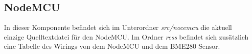 \subsection{NodeMCU}
In dieser Komponente befindet sich im Unterordner \textit{src/nocemcu} die aktuell einzige Quelltextdatei für den NodeMCU.
Im Ordner \textit{ress} befindet sich zusätzlich eine Tabelle des Wirings von dem NodeMCU und dem BME280-Sensor.





